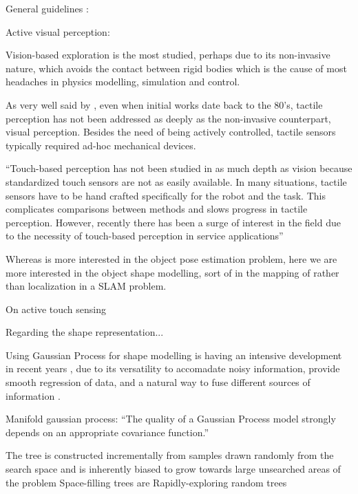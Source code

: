 
General guidelines : \citet{Bajcsy1989Machine}

Active visual perception: \citet{Bajcsy1988Active}

Vision-based exploration is the most studied, perhaps due to its non-invasive nature, which avoids the contact between rigid bodies which is the cause of most headaches in physics modelling, simulation and control.

As very well said by \citet{Petrovskaya2011Global}, even when initial works date back to the 80's, tactile perception has not been addressed as deeply as the non-invasive counterpart, visual perception. Besides the need of being actively controlled, tactile sensors typically required ad-hoc mechanical devices.

``Touch-based perception has not been studied in as much depth
as vision because standardized touch sensors are not as easily
available. In many situations, tactile sensors have to be hand
crafted specifically for the robot and the task. This complicates
comparisons between methods and slows progress in tactile
perception. However, recently there has been a surge of interest
in the field due to the necessity of touch-based perception in
service applications''

Whereas \citet{Petrovskaya2011Global} is more interested in the object pose estimation problem, here we are more interested in the object shape modelling, sort of in the mapping of rather than localization in a SLAM problem.

On active touch sensing \citet{Prescott2011Active}


Regarding the shape representation...

Using Gaussian Process for shape modelling is having an intensive development in recent years \citep{Mahler2015Grasp,Rosales2014Active,Bjorkman2013Enhancing,Dragiev2011Gaussian}, due to its versatility to accomadate noisy information, provide smooth regression of data, and a natural way to fuse different sources of information \citep{Rasmussen2006Gaussian}.

Manifold gaussian process: \citet{Calandra2014Manifold} ``The quality of a Gaussian Process model strongly depends on an appropriate covariance function.''

The tree is constructed incrementally from samples drawn randomly from the search space and is inherently biased to grow towards large unsearched areas of the problem
Space-filling trees are 
Rapidly-exploring random trees \citet{LaValle2011Motion}

